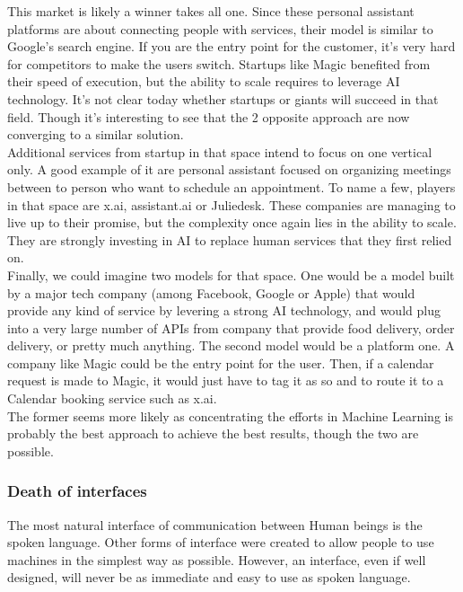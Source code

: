 \documentclass[12pt]{article}
\begin{document}
This market is likely a winner takes all one. Since these personal assistant
platforms are about connecting people with services, their model is similar to
Google's search engine. If you are the entry point for the customer, it's very
hard for competitors to make the users switch. Startups like Magic benefited
from their speed of execution, but the ability to scale requires to leverage AI
technology. It's not clear today whether startups or giants will succeed in that
field. Though it's interesting to see that the 2 opposite approach are now converging
to a similar solution.\\

Additional services from startup in that space intend to focus on one vertical
only. A good example of it are personal assistant focused on organizing meetings
between to person who want to schedule an appointment. To name a few, players in
that space are x.ai, assistant.ai or Juliedesk. These companies are managing to
live up to their promise, but the complexity once again lies in the ability to
scale. They are strongly investing in AI to replace human services that they
first relied on.\\

Finally, we could imagine two models for that space.
One would be a model built by a major tech company (among Facebook, Google or
Apple) that would provide any kind of service by levering a strong AI
technology, and would plug into a very large number of APIs from company that
provide food delivery, order delivery, or pretty much anything.
The second model would be a platform one. A company like Magic could be the
entry point for the user. Then, if a calendar request is made to Magic, it would
just have to tag it as so and to route it to a Calendar booking service such as
x.ai.\\

The former seems more likely as concentrating the efforts in Machine Learning is
probably the best approach to achieve the best results, though the two are
possible.

\subsubsection{Death of interfaces}

The most natural interface of communication between Human beings is the spoken language.
Other forms of interface were created to allow people to use machines in the simplest way as
possible. However, an interface, even if well designed, will never be as immediate and
easy to use as spoken language.
\end{document}

